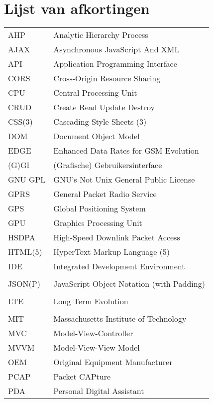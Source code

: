 \documentclass[master=cws,dutch,masteroption={vs,gs},inputenc=utf8]{kulemt}
\begin{document}
\chapter{Lijst van afkortingen}
\begin{flushleft}
  \renewcommand{\arraystretch}{1.1}
  \begin{longtable}{p{2cm} l}
     AHP & Analytic Hierarchy Process \\
     AJAX & Asynchronous JavaScript And XML \\
     API & Application Programming Interface \\
     CORS & Cross-Origin Resource Sharing \\
     CPU & Central Processing Unit \\
     CRUD & Create Read Update Destroy \\
     CSS(3) & Cascading Style Sheets (3) \\
     DOM & Document Object Model \\
     EDGE & Enhanced Data Rates for GSM Evolution \\
     (G)GI & (Grafische) Gebruikersinterface \\
     GNU GPL & GNU's Not Unix General Public License \\
     GPRS & General Packet Radio Service \\
     GPS & Global Positioning System \\
     GPU & Graphics Processing Unit \\
     HSDPA & High-Speed Downlink Packet Access \\
     HTML(5) & HyperText Markup Language (5) \\
     IDE & Integrated Development Environment \\
     \jqma{} & \jqm{} \\
     JSON(P)  & JavaScript Object Notation (with Padding) \\
     \kendoa{} & \kendo{} \\
     LTE & Long Term Evolution \\
     \lungoa{} & \lungo{} \\
     MIT & Massachusetts Institute of Technology \\
     MVC & Model-View-Controller \\
     MVVM & Model-View-View Model \\
     OEM & Original Equipment Manufacturer \\
     PCAP & Packet CAPture \\
     PDA & Personal Digital Assistant \\

\end{longtable}
\end{flushleft}
\end{document}
